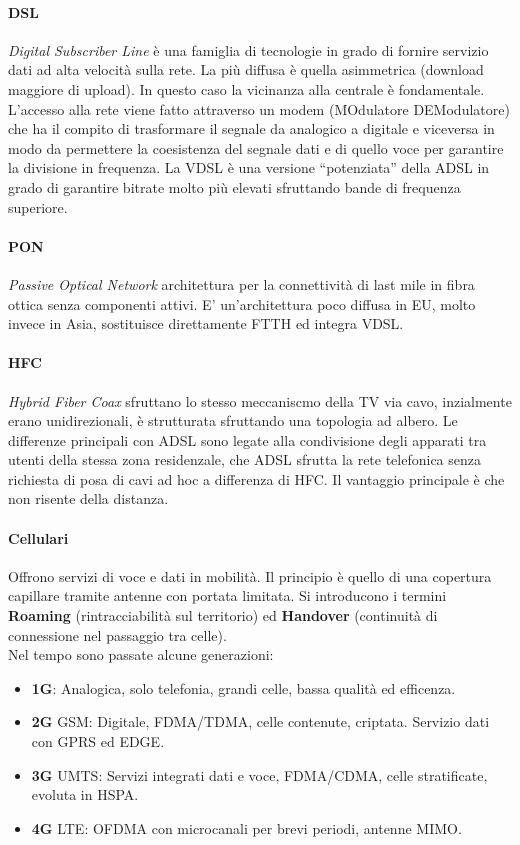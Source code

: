 \documentclass[12pt]{article}
\begin{document}
\paragraph{DSL}
\textit{Digital Subscriber Line} è una famiglia di tecnologie in grado di fornire servizio dati ad alta velocità sulla rete. La più diffusa è quella asimmetrica (download maggiore di upload). In questo caso la vicinanza alla centrale è fondamentale.\\
L'accesso alla rete viene fatto attraverso un modem (MOdulatore DEModulatore) che ha il compito di trasformare il segnale da analogico a digitale e viceversa in modo da permettere la coesistenza del segnale dati e di quello voce per garantire la divisione in frequenza. La VDSL è una versione ``potenziata'' della ADSL in grado di garantire bitrate molto più elevati sfruttando bande di frequenza superiore.

\paragraph{PON}
\textit{Passive Optical Network} architettura per la connettività di last mile in fibra ottica senza componenti attivi. E' un'architettura poco diffusa in EU, molto invece in Asia, sostituisce direttamente FTTH ed integra VDSL.

\paragraph{HFC}
\textit{Hybrid Fiber Coax} sfruttano lo stesso meccaniscmo della TV via cavo, inzialmente erano unidirezionali, è strutturata sfruttando una topologia ad albero. Le differenze principali con ADSL sono legate alla condivisione degli apparati tra utenti della stessa zona residenzale, che ADSL sfrutta la rete telefonica senza richiesta di posa di cavi ad hoc a differenza di HFC. Il vantaggio principale è che non risente della distanza.\\

\paragraph{Cellulari}
Offrono servizi di voce e dati in mobilità. Il principio è quello di una copertura capillare tramite antenne con portata limitata. Si introducono i termini \textbf{Roaming} (rintracciabilità sul territorio) ed \textbf{Handover} (continuità di connessione nel passaggio tra celle).\\
Nel tempo sono passate alcune generazioni:
\begin{itemize}
  \item \textbf{1G}: Analogica, solo telefonia, grandi celle, bassa qualità ed efficenza.
  \item \textbf{2G} GSM: Digitale, FDMA/TDMA, celle contenute, criptata. Servizio dati con GPRS ed EDGE.
  \item \textbf{3G} UMTS: Servizi integrati dati e voce, FDMA/CDMA, celle stratificate, evoluta in HSPA.
  \item \textbf{4G} LTE: OFDMA con microcanali per brevi periodi, antenne MIMO.
\end{itemize}
\end{document}
